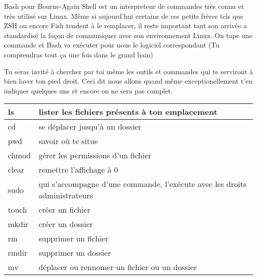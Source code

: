 \documentclass[a4paper, 12pt]{article}
\begin{document}
{\comfortaa

    Bash pour Bourne-Again Shell est un interpreteur de commandes très connu et très utilisé sur Linux. Même si aujourd'hui
    certains de ces petits frères tels que ZSH ou encore Fish tendent à le remplacer, il reste important tant
    son arrivée a standardisé la façon de communiquer avec son environnement Linux.
    \newline \newline
    On tape une commande et Bash va exécuter pour nous le logiciel correspondant
    (Tu comprendras tout ça une fois dans le grand bain)

    \vspace{0.6cm}

    Tu seras invité à chercher par toi même les outils et commandes
    qui te serviront à bien laver ton pied droit. Ceci dit nous allons
    quand même
    \newline
    exceptionellement t'en indiquer quelques uns et encore
    on ne sera pas complet.

    
    \begin{tabular}{|p{2cm}|p{14cm}|} 
        \hline
        ls & lister les fichiers présents à ton emplacement \\
        \hline
        cd & se déplacer jusqu'à un dossier \\
        \hline
        pwd & savoir où te situe \\
        \hline
        chmod & gérer les permissions d'un fichier \\
        \hline
        clear & remettre l'affichage à 0 \\
        \hline
        sudo & qui s'accompagne d'une commande, l'exécute avec les droits administrateurs \\
        \hline
        touch & créer un fichier \\
        \hline
        mkdir & créer un dossier \\
        \hline
        rm & supprimer un fichier \\
        \hline
        rmdir & supprimer un dossier \\
        \hline
        mv & déplacer ou rennomer un fichier ou un dossier \\
        \hline
    \end{tabular}

}
\end{document}
